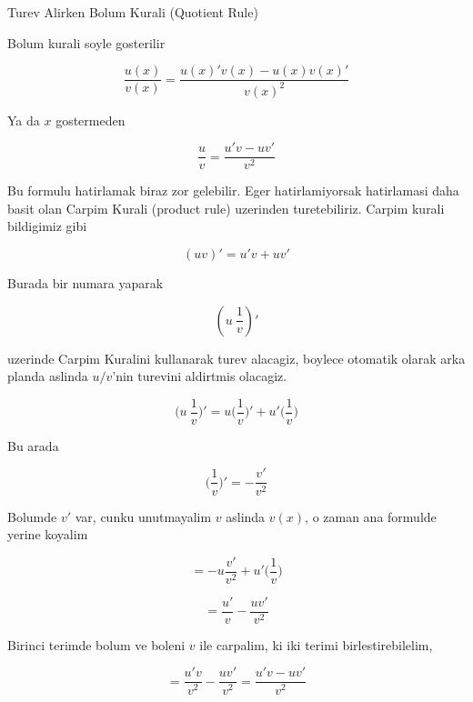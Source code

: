 \documentclass[12pt,fleqn]{article}
\begin{document}
Turev Alirken Bolum Kurali (Quotient Rule)

Bolum kurali soyle gosterilir 

\[ \frac{ u(x)}{v(x)} = \frac{u(x)'v(x) - u(x)v(x)'}{v(x)^2} \]

Ya da $x$ gostermeden

\[ \frac{ u}{v} = \frac{u'v - uv'}{v^2} \]

Bu formulu hatirlamak biraz zor gelebilir. Eger hatirlamiyorsak hatirlamasi
daha basit olan Carpim Kurali (product rule) uzerinden
turetebiliriz. Carpim kurali bildigimiz gibi

\[ (uv)' = u'v + uv' \]

Burada bir numara yaparak 

\[ (u \ \frac{ 1}{v})' \]

uzerinde Carpim Kuralini kullanarak turev alacagiz, boylece otomatik olarak
arka planda aslinda $u/v$'nin turevini aldirtmis olacagiz. 

\[ \bigg(u \ \frac{ 1}{v}\bigg)' = 
u \bigg(\frac{1}{v}\bigg)' + u' \bigg(\frac{1}{v}\bigg)
\]

Bu arada

\[ \bigg(\frac{ 1}{v}\bigg)'  = -\frac{v'}{v^2} \]

Bolumde $v'$ var, cunku unutmayalim $v$ aslinda $v(x)$, o zaman ana
formulde yerine koyalim

\[  = 
-u\frac{v'}{v^2}  + u' \bigg(\frac{1}{v}\bigg)
\]

\[  = 
\frac{u' }{v} -\frac{uv'}{v^2}
\]


Birinci terimde bolum ve boleni $v$ ile carpalim, ki iki terimi
birlestirebilelim, 

\[  = 
\frac{u'v }{v^2} -\frac{uv'}{v^2} = 
\frac{u'v-uv'}{v^2}
\]
\end{document}

